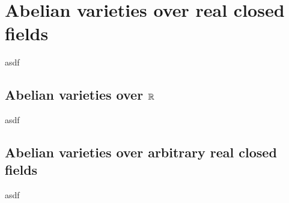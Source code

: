 \chapter{Abelian varieties over real closed fields}
asdf

\section{Abelian varieties over $\mathbb{R}$}
asdf

\section{Abelian varieties over arbitrary real closed fields}
asdf